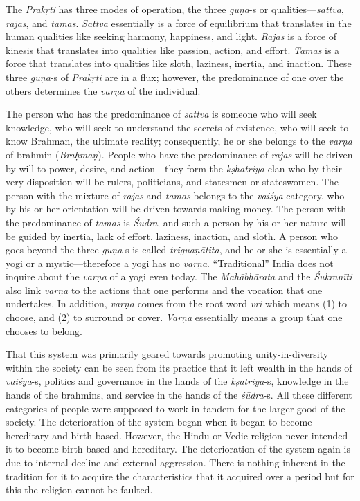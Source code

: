 The \textit{Prakṛti}  has three modes of operation, the three \textit{guṇa}-s or qualities—\textit{sattva},  \textit{rajas},   and \textit{tamas}. \textit{Sattva} essentially is a force of equilibrium that translates in the human qualities like seeking harmony, happiness, and light. \textit{Rajas} is a force of kinesis that translates into qualities like passion, action, and effort. \textit{Tamas} is a force that translates into qualities like sloth, laziness, inertia, and inaction. These three \textit{guṇa}-s of \textit{Prakṛti}  are in a flux; however, the predominance of one over the others determines the \textit{varṇa} of the individual.


The person who has the predominance of \textit{sattva} is someone who will seek knowledge, who will seek to understand the secrets of existence, who will seek to know Brahman, the ultimate reality; consequently, he or she belongs to the \textit{varṇa} of brahmin (\textit{Braḥmaṇ}). People who have the predominance of \textit{rajas} will be driven by will-to-power, desire, and action—they form the \textit{kṣhatriya} clan who by their very disposition will be rulers, politicians, and statesmen or stateswomen. The person with the mixture of \textit{rajas} and \textit{tamas} belongs to the \textit{vaiśya} category, who by his or her orientation will be driven towards making money. The person with the predominance of \textit{tamas} is \textit{Śudra},  and such a person by his or her nature will be guided by inertia, lack of effort, laziness, inaction, and sloth. A person who goes beyond the three \textit{guṇa}-s is called \textit{triguaṇātita},  and he or she is essentially a yogi or a mystic—therefore a yogi has no \textit{varṇa}. “Traditional” India does not inquire about the \textit{varṇa} of a yogi even today. The \textit{Mahābhārata} and the \textit{Śukranīti} also link \textit{varṇa} to the actions that one performs and the vocation that one undertakes. In addition, \textit{varṇa} comes from the root word \textit{vri} which means (1) to choose, and (2) to surround or cover. \textit{Varṇa} essentially means a group that one chooses to belong.

That this system was primarily geared towards promoting unity-in-diversity within the society can be seen from its practice that it left wealth in the hands of \textit{vaiśya}-s,  politics and governance in the hands of the \hbox{\textit{kṣatriya}-s},  knowledge in the hands of the brahmins, and service in the hands of the \textit{śūdra}-s. All these different categories of people were supposed to work in tandem for the larger good of the society. The deterioration of the system began when it began to become hereditary and birth-based. However, the Hindu or Vedic religion never intended it to become birth-based and hereditary. The deterioration of the system again is due to internal decline and external aggression. There is nothing inherent in the tradition for it to acquire the characteristics that it acquired over a period but for this the religion cannot be faulted.
\eject

